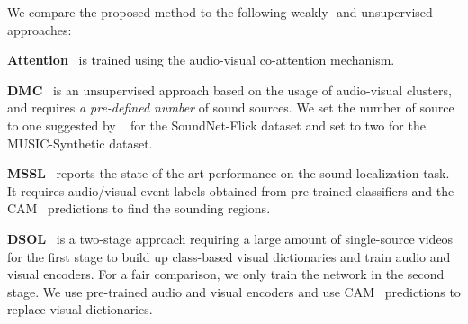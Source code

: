 We compare the proposed method to the following weakly- and unsupervised approaches:
\begin{compactitem}
\item\textbf{Attention}~\cite{av_cvpr18_lls,av_tpami20_lls} is trained using the audio-visual co-attention mechanism.

\item \textbf{DMC}~\cite{av_cvpr19_deep_cluster} is an unsupervised approach based on the usage of audio-visual clusters, and  requires \emph{a pre-defined number} of sound sources. We set the number of source to one suggested by ~\cite{av_cvpr19_deep_cluster,av_arxiv_curricumlum_av_clutser} for the SoundNet-Flick dataset and set to two for the MUSIC-Synthetic dataset.

\item \textbf{MSSL}~\cite{av_eccv20_mms_loc} reports the state-of-the-art performance on the sound localization task. It requires audio/visual event labels obtained from pre-trained classifiers and the CAM~\cite{cvpr16_CAM} predictions to find the sounding regions. %

\item \textbf{DSOL}~\cite{av_nips20_loc} is a two-stage approach requiring a large amount of single-source videos for the first stage to build up class-based visual dictionaries and train audio and visual encoders. %
For a fair comparison, we only train the network in the second stage.
We use pre-trained audio and visual encoders and use CAM~\cite{cvpr16_CAM} predictions to replace visual dictionaries.


\end{compactitem}





